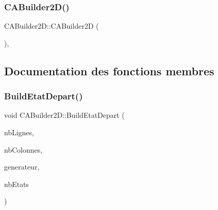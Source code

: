 \subsubsection{\texorpdfstring{C\+A\+Builder2\+D()}{CABuilder2D()}\hspace{0.1cm}{\footnotesize\ttfamily [2/2]}}
{\footnotesize\ttfamily C\+A\+Builder2\+D\+::\+C\+A\+Builder2D (\begin{DoxyParamCaption}\item[{const \mbox{\hyperlink{class_c_a_builder2_d}{C\+A\+Builder2D}} \&}]{ }\end{DoxyParamCaption})\hspace{0.3cm}{\ttfamily [private]}, {\ttfamily [delete]}}



\subsection{Documentation des fonctions membres}
\mbox{\label{class_c_a_builder2_d_af1b276f92d8dd9a914d123b16cc518c7}} 
\subsubsection{\texorpdfstring{Build\+Etat\+Depart()}{BuildEtatDepart()}\hspace{0.1cm}{\footnotesize\ttfamily [1/3]}}
{\footnotesize\ttfamily void C\+A\+Builder2\+D\+::\+Build\+Etat\+Depart (\begin{DoxyParamCaption}\item[{unsigned int}]{nb\+Lignes,  }\item[{unsigned int}]{nb\+Colonnes,  }\item[{\mbox{\hyperlink{class_generateur_etat}{Generateur\+Etat}} const \&}]{generateur,  }\item[{int}]{nb\+Etats }\end{DoxyParamCaption})\hspace{0.3cm}{\ttfamily [inline]}}

\mbox{\label{class_c_a_builder2_d_aa447c4c66f830ea0dd552592eb606336}} 
